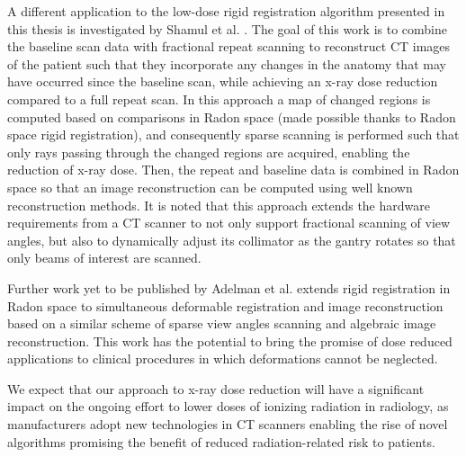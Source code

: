 A different application to the low-dose rigid registration algorithm presented in this thesis is investigated by Shamul et al. \cite{shamul2017radon}. The goal of this work is to combine the baseline scan data with fractional repeat scanning to reconstruct CT images of the patient such that they incorporate any changes in the anatomy that may have occurred since the baseline scan, while achieving an x-ray dose reduction compared to a full repeat scan. In this approach a map of changed regions is computed based on comparisons in Radon space (made possible thanks to Radon space rigid registration), and consequently sparse scanning is performed such that only rays passing through the changed regions are acquired, enabling the reduction of x-ray dose. Then, the repeat and baseline data is combined in Radon space so that an image reconstruction can be computed using well known reconstruction methods. It is noted that this approach extends the hardware requirements from a CT scanner to not only support fractional scanning of view angles, but also to dynamically adjust its collimator as the gantry rotates so that only beams of interest are scanned.

Further work yet to be published by Adelman et al. extends rigid registration in Radon space to simultaneous deformable registration and image reconstruction based on a similar scheme of sparse view angles scanning and algebraic image reconstruction. This work has the potential to bring the promise of dose reduced applications to clinical procedures in which deformations cannot be neglected.

We expect that our approach to x-ray dose reduction will have a significant impact on the ongoing effort to lower doses of ionizing radiation in radiology, as manufacturers adopt new technologies in CT scanners enabling the rise of novel algorithms promising the benefit of reduced radiation-related risk to patients.